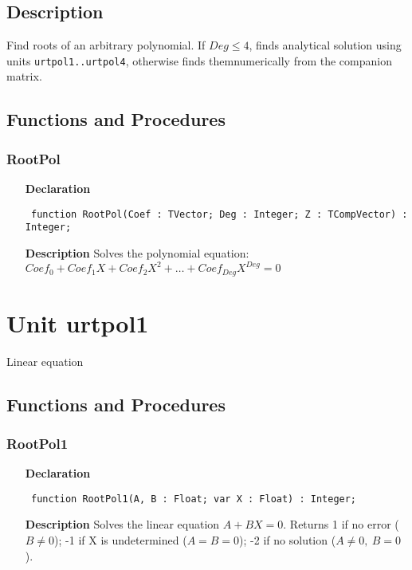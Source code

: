 \documentclass[12pt,a4paper,oneside]{report}
\newcommand{\declarationitem}[1]{\textbf{#1}}
\newcommand{\descriptiontitle}[1]{\textbf{#1}}
\newcommand{\code}[1]{\texttt{#1}}
\begin{document}
\subsection{Description}
Find roots of an arbitrary polynomial. If $Deg \le 4$, finds analytical solution using units \code{urtpol1..urtpol4}, otherwise finds themnumerically from the companion matrix.
\subsection{Functions and Procedures}
\subsubsection{RootPol}
\label{urootpol-RootPol}
\begin{itemize}\item[\declarationitem{Declaration}\hfill]
	\begin{flushleft}
		\code{
			function RootPol(Coef : TVector; Deg : Integer; Z : TCompVector) : Integer;}
		
	\end{flushleft}
	
	\par
	\item[\descriptiontitle{Description}]
	Solves the polynomial equation:\\ 
	$Coef_0 + Coef_1 X + Coef_2 X^2 + \dots + Coef_{Deg} X^{Deg} = 0$
	
\end{itemize}


\section{Unit urtpol1}
\label{urtpol1}
Linear equation 
\subsection{Functions and Procedures}
\subsubsection{RootPol1}
\label{urtpol1-RootPol1}
\begin{itemize}\item[\declarationitem{Declaration}\hfill]
	\begin{flushleft}
		\code{
			function RootPol1(A, B : Float; var X : Float) : Integer;}
		
	\end{flushleft}
	
	\par
	\item[\descriptiontitle{Description}]
	Solves the linear equation $A + B X = 0$. Returns 1 if no error ($B \ne 0$); -1 if X is undetermined ($A = B = 0$); -2 if no solution ($A \ne 0,\ B = 0$).
\end{itemize}
\end{document}
